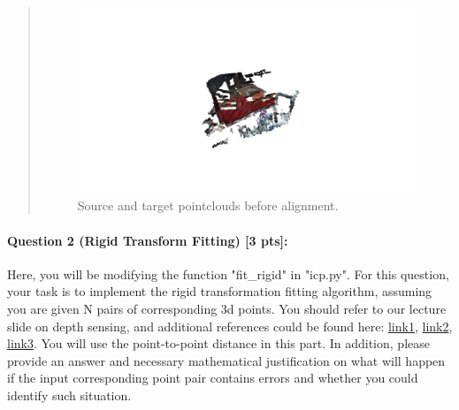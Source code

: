 \documentclass[11pt]{article}
\begin{document}
\begin{quote}
\begin{figure}[h]
    \centering
    \includegraphics[width=1.0\linewidth]{pcds_raw.jpg}
    \caption{Source and target pointclouds before alignment.}
    \label{fig:pcds_raw}
\end{figure}

\end{quote}

\paragraph{Question 2 (Rigid Transform Fitting) [3 pts]:} Here, you will be modifying the function "fit\_rigid" in "icp.py". For this question, your task is to implement the rigid transformation fitting algorithm, assuming you are given N pairs of corresponding 3d points. You should refer to our lecture slide on depth sensing, and additional references could be found here: \href{https://www.ltu.se/cms_fs/1.51590!/svd-fitting.pdf}{link1}, \href{https://igl.ethz.ch/projects/ARAP/svd_rot.pdf}{link2}, \href{https://en.wikipedia.org/wiki/Orthogonal_Procrustes_problem}{link3}. You will use the point-to-point distance in this part. 
In addition, please provide an answer and necessary mathematical justification on what will happen if the input corresponding point pair contains errors and whether you could identify such situation. %
\end{document}
